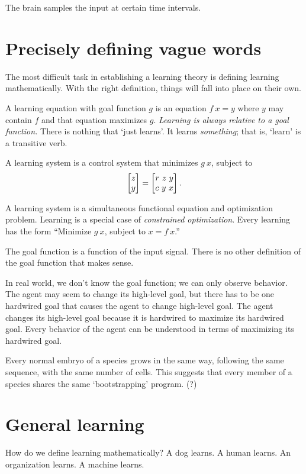 The brain samples the input at certain time intervals.

\section{Precisely defining vague words}

The most difficult task in establishing a learning theory is defining learning mathematically.
With the right definition, things will fall into place on their own.

A learning equation with goal function \(g\)
is an equation \( f~x = y \) where \( y \) may contain \( f \)
and that equation maximizes \( g \).
\emph{Learning is always relative to a goal function.}
There is nothing that `just learns'.
It learns \emph{something};
that is, `learn' is a transitive verb.

A learning system is a control system that minimizes \(g~x\), subject to
\[
    \begin{bmatrix}z \\ y\end{bmatrix} = \begin{bmatrix}r~z~y \\ c~y~x\end{bmatrix}.
\]

A learning system is a simultaneous functional equation and optimization problem.
Learning is a special case of \emph{constrained optimization}.
Every learning has the form ``Minimize \(g~x\), subject to \(x = f~x\).''

The goal function is a function of the input signal.
There is no other definition of the goal function that makes sense.

In real world, we don't know the goal function;
we can only observe behavior.
The agent may seem to change its high-level goal,
but there has to be one hardwired goal that causes the agent to change high-level goal.
The agent changes its high-level goal because it is hardwired to maximize its hardwired goal.
Every behavior of the agent can be understood in terms of maximizing its hardwired goal.

Every normal embryo of a species grows in the same way,
following the same sequence,
with the same number of cells.
This suggests that every member of a species
shares the same `bootstrapping' program. (?)

\section{General learning}

How do we define learning mathematically?
A dog learns. A human learns. An organization learns. A machine learns.

